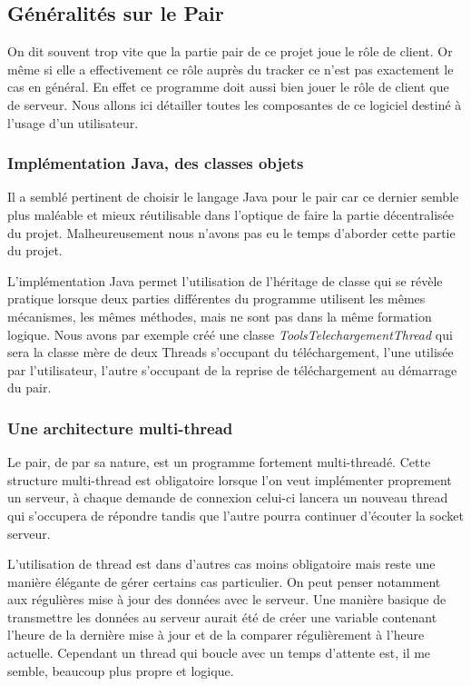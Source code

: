 


\subsection{Généralités sur le Pair}
On dit souvent trop vite que la partie pair de ce projet joue le rôle
de client. Or même si elle a effectivement ce rôle auprès du tracker
ce n'est pas exactement le cas en général. En effet ce programme doit
aussi bien jouer le rôle de client que de serveur. Nous allons ici
détailler toutes les composantes de ce logiciel destiné à l'usage d'un
utilisateur.

\subsubsection{Implémentation Java, des classes objets}
Il a semblé pertinent de choisir le langage Java pour le pair car ce
dernier semble plus maléable et mieux réutilisable dans l'optique de
faire la partie décentralisée du projet. Malheureusement nous n'avons
pas eu le temps d'aborder cette partie du projet.

L'implémentation Java permet l'utilisation de l'héritage de classe qui
se révèle pratique lorsque deux parties différentes du programme
utilisent les mêmes mécanismes, les mêmes méthodes, mais ne sont pas
dans la même formation logique. Nous avons par exemple créé une classe
\textit{ToolsTelechargementThread} qui sera la classe mère de deux
Threads s'occupant du téléchargement, l'une utilisée par l'utilisateur,
l'autre s'occupant de la reprise de téléchargement au démarrage du
pair.

\subsubsection{Une architecture multi-thread}
Le pair, de par sa nature, est un programme fortement
multi-threadé. Cette structure multi-thread est obligatoire lorsque
l'on veut implémenter proprement un serveur, à chaque demande de
connexion celui-ci lancera un nouveau thread qui s'occupera de
répondre tandis que l'autre pourra continuer d'écouter la socket
serveur.

L'utilisation de thread est dans d'autres cas moins obligatoire mais
reste une manière élégante de gérer certains cas particulier. On peut
penser notamment aux régulières mise à jour des données avec le
serveur. Une manière basique de transmettre les données au serveur
aurait été de créer une variable contenant l'heure de la dernière mise à
jour et de la comparer régulièrement à l'heure actuelle. Cependant un
thread qui boucle avec un temps d'attente est, il me semble, beaucoup
plus propre et logique.

